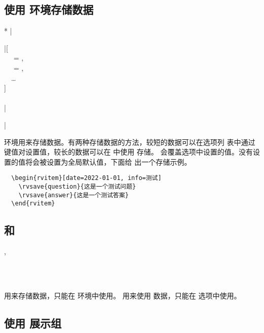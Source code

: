 \documentclass[full]{l3doc}
\begin{document}
\begin{documentation}
\subsection{使用  环境存储数据}

\noindent{}
\begin{Syntax}*
  |\begin{rvitem}|[ \\
  ~~ = , \\
  ~~ = , \\
  ~~\ldots{} \\
  ] \\
  ~~ \\
  |\end{rvitem}|
\end{Syntax}

   环境用来存储数据。有两种存储数据的方法，较短的数据可以在选项列
  表中通过键值对设置值，较长的数据可以在  中使用  存储。
  会覆盖选项中设置的值。没有设置的值将会被设置为全局默认值，下面给
  出一个存储示例。

\begin{verbatim}
  \begin{rvitem}[date=2022-01-01, info=测试]
    \rvsave{question}{这是一个测试问题}
    \rvsave{answer}{这是一个测试答案}
  \end{rvitem}
\end{verbatim}

\subsection{ 和 }

\begin{function}{\rvsave, \rvuse}
  \begin{syntax}
       \\
       \\
  \end{syntax}

   用来存储数据，只能在  环境中使用。 用来使用
  数据，只能在  选项中使用。
\end{function}

\subsection{使用  展示组}


\end{documentation}
\end{document}
